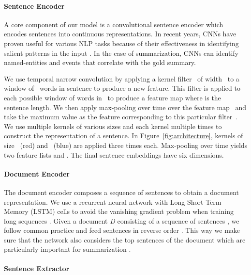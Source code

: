 \documentclass[11pt,a4paper]{article}
\newcommand\doc{{\it D }}
\begin{document}
\paragraph{Sentence Encoder}
A core component of our model is a convolutional sentence encoder
which encodes sentences into continuous representations. In recent
years, CNNs have proven useful for various NLP tasks
\cite{nlpscratch,kim-emnlp14,kalchbrenner-acl14,zhang-nips15,lei-emnlp15,kim-aaai16,jp-acl16}
because of their effectiveness in identifying salient patterns in the
input \cite{showattendtell}. In the case of summarization, CNNs can
identify named-entities and events that correlate with the gold
summary.

We use temporal narrow convolution by applying a kernel filter~ of
width~ to a window of~ words in sentence  to produce a new
feature. This filter is applied to each possible window of words
in~ to produce a feature map  where  is the
sentence length. We then apply max-pooling over time over the feature
map~ and take the maximum value as the feature corresponding to
this particular filter~. We use multiple kernels of various sizes
and each kernel multiple times to construct the representation of a
sentence.
In Figure~\ref{fig:architecture}, kernels of size~ (red) and~
(blue) are applied three times each. Max-pooling over time yields two
feature lists  and . The final sentence
embeddings have six dimensions.

\paragraph{Document Encoder}

The document encoder composes a sequence of sentences to obtain a
document representation. We use a recurrent neural network with Long
Short-Term Memory (LSTM) cells to avoid the vanishing gradient problem
when training long sequences \cite{lstm}. Given a document \doc
consisting of a sequence of sentences , we
follow common practice and feed sentences in reverse order
\cite{sutskever-nips14,lijurafsky-acl15,katja-emnlp15,narayan-arxiv17}. This
way we make sure that the network also considers the top sentences of
the document which are particularly important for summarization
\cite{rush-acl15,nallapati-signll16}.

\paragraph{Sentence Extractor}
\end{document}
